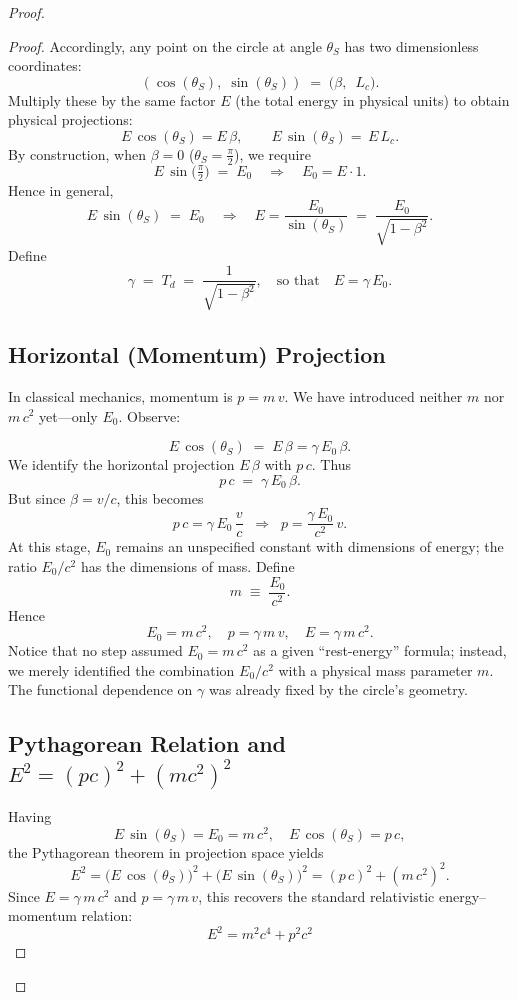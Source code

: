 \documentclass{article}
\begin{document}
\begin{proof}
\begin{proof}
Accordingly, any point on the circle at angle \(\theta_S\) has two dimensionless coordinates:
\[
  (\cos(\theta_S),\;\sin(\theta_S)) 
  \;=\; \bigl(\beta,\;\   L_c\bigr).
\]
Multiply these by the same factor \(E\) (the total energy in physical units) to obtain physical projections:
\[
  E\,\cos(\theta_S) 
  = E\,\beta, 
  \qquad
  E\,\sin(\theta_S) = \, E\, L_c.
\]
By construction, when \(\beta=0\) (\(\theta_S=\tfrac{\pi}{2}\)), we require
\[
  E\,\sin\!\bigl(\tfrac{\pi}{2}\bigr) \;=\; E_0
  \quad\Longrightarrow\quad
  E_0 = E \cdot 1.
\]
Hence in general,
\[
  E\,\sin(\theta_S) \;=\; E_0 
  \quad\Longrightarrow\quad
  E = \frac{E_0}{\sin(\theta_S)} \;=\; \frac{E_0}{\sqrt{1-\beta^2}}.
\]
Define 
\[
  \gamma \;=\; T_d \;=\;\frac{1}{\sqrt{1-\beta^2}}, 
  \quad
  \text{so that} 
  \quad
  E = \gamma\,E_0.
\]

\subsection*{Horizontal (Momentum) Projection}

In classical mechanics, momentum is \(p = m\,v\).  We have introduced neither \(m\) nor \(m\,c^2\) yet—only \(E_0\).  Observe:

\[
  E\,\cos(\theta_S) \;=\; E\,\beta 
  = \gamma\,E_0\,\beta.
\]
We identify the horizontal projection \(E\,\beta\) with \(p\,c\).  Thus
\[
  p\,c \;=\; \gamma\,E_0\,\beta.
\]
But since \(\beta = v/c\), this becomes 
\[
  p\,c = \gamma\,E_0\,\frac{v}{c}
  \;\;\Longrightarrow\;\;
  p = \frac{\gamma\,E_0}{c^2}\,v.
\]
At this stage, \(E_0\) remains an unspecified constant with dimensions of energy; the ratio \(E_0/c^2\) has the dimensions of mass.  Define
\[
  m \;\equiv\; \frac{E_0}{c^2}.
\]
Hence 
\[
  E_0 = m\,c^2, 
  \quad
  p = \gamma\,m\,v, 
  \quad
  E = \gamma\,m\,c^2.
\]
Notice that no step assumed \(E_0 = m\,c^2\) as a given “rest-energy” formula; instead, we merely identified the combination \(E_0/c^2\) with a physical mass parameter \(m\).  The functional dependence on \(\gamma\) was already fixed by the circle’s geometry.

\subsection*{Pythagorean Relation and \(E^2 = (pc)^2 + (mc^2)^2\)}

Having
\[
  E\,\sin(\theta_S) = E_0 = m\,c^2, 
  \quad
  E\,\cos(\theta_S) = p\,c,
\]
the Pythagorean theorem in projection space yields
\[
  E^2 
  = \bigl(E\,\cos(\theta_S)\bigr)^{2} 
    + \bigl(E\,\sin(\theta_S)\bigr)^{2}
  = (p\,c)^2 + (m\,c^2)^2.
\]
Since \(E = \gamma\,m\,c^2\) and \(p = \gamma\,m\,v\), this recovers the standard relativistic energy–momentum relation:
\begin{equation}
    \boxed{E^2 = m^2 c^4 + p^2 c^2}
\end{equation}


\end{proof}
\end{proof}
\end{document}
